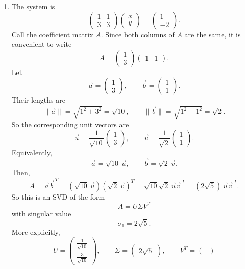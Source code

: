 \documentclass[10pt]{extarticle}
\begin{document}
\begin{enumerate}[label=(\alph*)]
\item The system is
\[
\begin{pmatrix}
1 & 1\\
3 & 3
\end{pmatrix}
\begin{pmatrix}
x\\y
\end{pmatrix}
=
\begin{pmatrix}
1\\-2
\end{pmatrix}.
\]
Call the coefficient matrix $A$. Since both columns of $A$ are the same, it is convenient to write
\[
A=
\begin{pmatrix}
1\\3
\end{pmatrix}
\begin{pmatrix}
1 & 1
\end{pmatrix}.
\]
Let
\[
\vec{a}=
\begin{pmatrix}
1\\3
\end{pmatrix},
\qquad
\vec{b}=
\begin{pmatrix}
1\\1
\end{pmatrix}.
\]
Their lengths are
\[
\|\vec{a}\|=\sqrt{1^2+3^2}=\sqrt{10},
\qquad
\|\vec{b}\|=\sqrt{1^2+1^2}=\sqrt{2}.
\]
So the corresponding unit vectors are
\[
\vec{u}=\frac{1}{\sqrt{10}}
\begin{pmatrix}
1\\3
\end{pmatrix},
\qquad
\vec{v}=\frac{1}{\sqrt{2}}
\begin{pmatrix}
1\\1
\end{pmatrix}.
\]
Equivalently,
\[
\vec{a}=\sqrt{10}\,\vec{u},
\qquad
\vec{b}=\sqrt{2}\,\vec{v}.
\]
Then,
\[
A=\vec{a}\vec{b}^{\,T}
=(\sqrt{10}\,\vec{u})(\sqrt{2}\,\vec{v})^T
=\sqrt{10}\sqrt{2}\,\vec{u}\vec{v}^{\,T}
=(2\sqrt{5})\,\vec{u}\vec{v}^{\,T}.
\]
So this is an SVD of the form
\[
A=U\Sigma V^T
\]
with singular value
\[
\sigma_1=2\sqrt{5}.
\]
More explicitly,
\[
U=
\begin{pmatrix}
\frac{1}{\sqrt{10}}\\[0.4em]
\frac{3}{\sqrt{10}}
\end{pmatrix},
\qquad
\Sigma=
\begin{pmatrix}
2\sqrt{5}
\end{pmatrix},
\qquad
V^T=
\begin{pmatrix}

\end{pmatrix}\]
\end{enumerate}
\end{document}
